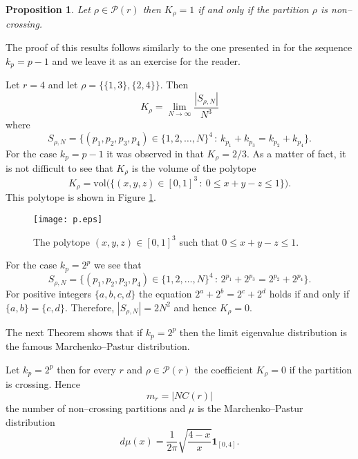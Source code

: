 \documentclass[smallextended]{svjour3}
\newtheorem{prop}{Proposition}
\begin{document}
\begin{prop}
Let $\rho\in\mathcal{P}(r)$ then $K_{\rho}=1$ if and only if the partition $\rho$ is non--crossing.
\end{prop}
The proof of this results follows similarly to the one presented in \cite{GC02} for the sequence $k_{p}=p-1$ and we leave it as an exercise for the reader. 

\begin{example} Let $r=4$ and let $\rho=\{\{1,3\},\{2,4\}\}$. Then
$$
K_{\rho}=\lim_{N\to\infty}\frac{|S_{\rho,N}|}{N^3}
$$
where 
$$
S_{\rho,N}=\big\{(p_1,p_2,p_3,p_4)\in \{1,2,\ldots,N\}^{4}\,:\,k_{p_1}+k_{p_3}=k_{p_2}+k_{p_4}\big\}.
$$
For the case $k_{p}=p-1$ it was observed in \cite{GC02} that $K_{\rho}=2/3$. As a matter of fact, it is not difficult to see that $K_{\rho}$ is the volume of the polytope
$$
K_{\rho}=\mathrm{vol}\big(\{(x,y,z)\in [0,1]^3\,:\ 0\leq x+y-z\leq 1\}\big).
$$
This polytope is shown in Figure \ref{poly}. 
\begin{figure}[!Ht]
  \begin{center}
    \texttt{[image: p.eps]}
    \caption{The polytope $(x,y,z)\in [0,1]^{3}$ such that $0\leq x+y-z\leq 1$.}
    \label{poly}
  \end{center}
\end{figure}
For the case $k_{p}=2^{p}$ we see that 
$$
S_{\rho,N}=\big\{(p_1,p_2,p_3,p_4)\in \{1,2,\ldots,N\}^{4}\,:\,2^{p_1}+2^{p_3}=2^{p_2}+2^{p_4}\big\}.
$$
For positive integers $\{a,b,c,d\}$ the equation $2^{a}+2^{b}=2^{c}+2^{d}$ holds if and only if $\{a,b\}=\{c,d\}$. Therefore, $|S_{\rho,N}|=2N^2$ and hence $K_{\rho}=0$.

\end{example}

The next Theorem shows that if $k_p=2^p$ then the limit eigenvalue distribution is the famous Marchenko--Pastur distribution. 

\begin{theorem}
Let $k_{p}=2^{p}$ then for every $r$ and $\rho\in\mathcal{P}(r)$ the coefficient $K_{\rho}=0$ if the partition is crossing. Hence
$$
m_{r}=|NC(r)|
$$
the number of non--crossing partitions and $\mu$ is the Marchenko--Pastur distribution
$$
d\mu(x)=\frac{1}{2\pi}\sqrt{\frac{4-x}{x}}\mathbf{1}_{[0,4]}.
$$
\end{theorem}
\end{document}
